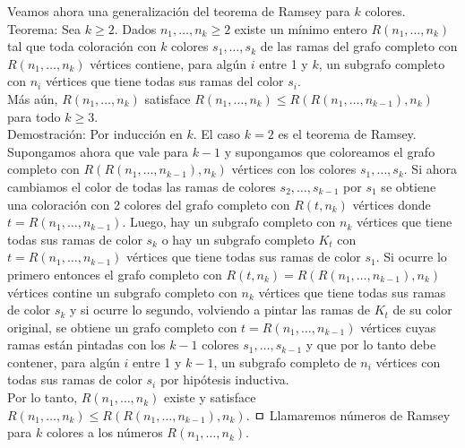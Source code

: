 \documentclass[10pt]{article}
\begin{document}
Veamos ahora una generalización del teorema de Ramsey para $k$ colores.\\
Teorema: Sea $k \geq 2$. Dados $n_{1}, \ldots, n_{k} \geq 2$ existe un mínimo entero $R\left(n_{1}, \ldots, n_{k}\right)$ tal que toda coloración con $k$ colores $s_{1}, \ldots, s_{k}$ de las ramas del grafo completo con $R\left(n_{1}, \ldots, n_{k}\right)$ vértices contiene, para algún $i$ entre 1 y $k$, un subgrafo completo con $n_{i}$ vértices que tiene todas sus ramas del color $s_{i}$.\\
Más aún, $R\left(n_{1}, \ldots, n_{k}\right)$ satisface $R\left(n_{1}, \ldots, n_{k}\right) \leq R\left(R\left(n_{1}, \ldots, n_{k-1}\right), n_{k}\right)$ para todo $k \geq 3$.\\
Demostración: Por inducción en $k$. El caso $k=2$ es el teorema de Ramsey.\\
Supongamos ahora que vale para $k-1$ y supongamos que coloreamos el grafo completo con $R\left(R\left(n_{1}, \ldots, n_{k-1}\right), n_{k}\right)$ vértices con los colores $s_{1}, \ldots, s_{k}$. Si ahora cambiamos el color de todas las ramas de colores $s_{2}, \ldots, s_{k-1}$ por $s_{1}$ se obtiene una coloración con 2 colores del grafo completo con $R\left(t, n_{k}\right)$ vértices donde $t=R\left(n_{1}, \ldots, n_{k-1}\right)$. Luego, hay un subgrafo completo con $n_{k}$ vértices que tiene todas sus ramas de color $s_{k}$ o hay un subgrafo completo $K_{t}$ con $t=R\left(n_{1}, \ldots, n_{k-1}\right)$ vértices que tiene todas sus ramas de color $s_{1}$. Si ocurre lo primero entonces el grafo completo con $R\left(t, n_{k}\right)=R\left(R\left(n_{1}, \ldots, n_{k-1}\right), n_{k}\right)$ vértices contine un subgrafo completo con $n_{k}$ vértices que tiene todas sus ramas de color $s_{k}$ y si ocurre lo segundo, volviendo a pintar las ramas de $K_{t}$ de su color original, se obtiene un grafo completo con $t=R\left(n_{1}, \ldots, n_{k-1}\right)$ vértices cuyas ramas están pintadas con los $k-1$ colores $s_{1}, \ldots, s_{k-1}$ y que por lo tanto debe contener, para algún $i$ entre 1 y $k-1$, un subgrafo completo de $n_{i}$ vértices con todas sus ramas de color $s_{i}$ por hipótesis inductiva.\\
Por lo tanto, $R\left(n_{1}, \ldots, n_{k}\right)$ existe y satisface $R\left(n_{1}, \ldots, n_{k}\right) \leq R\left(R\left(n_{1}, \ldots, n_{k-1}\right), n_{k}\right)$. ㅁ Llamaremos números de Ramsey para $k$ colores a los números $R\left(n_{1}, \ldots, n_{k}\right)$.
\end{document}
